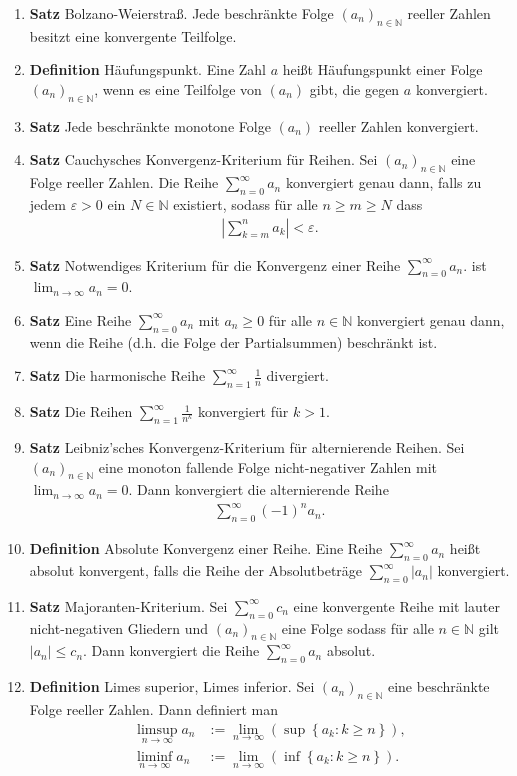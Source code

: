 \documentclass[draft,a5paper]{article}
\newcommand{\mg}[1]{\mathbb{#1}}
\newcommand{\defn}[1]{\item \textbf{Definition} #1.}
\newcommand{\satz}[1]{\item \textbf{Satz} #1.}
\begin{document}
\begin{enumerate}
\satz{Bolzano-Weierstraß}  Jede beschränkte Folge
\((a_n)_{n\in \mg{N}}\) reeller Zahlen besitzt eine
konvergente Teilfolge.

\defn{Häufungspunkt} Eine Zahl \(a\) heißt Häufungspunkt
einer Folge \((a_n)_{n \in \mg{N}}\), wenn es eine
Teilfolge von \((a_n)\) gibt, die gegen \(a\) konvergiert.

\satz{Jede beschränkte monotone Folge \((a_n)\) reeller
  Zahlen konvergiert}

\satz{Cauchysches Konvergenz-Kriterium für Reihen}  Sei
\((a_n)_{n \in \mg{N}}\) eine Folge reeller Zahlen.  Die
Reihe \(\sum_{n=0}^{\infty}{a_n}\) konvergiert genau dann,
falls zu jedem \(\varepsilon > 0\) ein \(N \in \mg{N}\)
existiert, sodass für alle \(n \ge m \ge N\) dass
\begin{align*}
\left| \sum_{k=m}^n{a_k} \right| < \varepsilon.
\end{align*}

\satz{Notwendiges Kriterium für die Konvergenz einer
  Reihe \(\sum_{n=0}^{\infty}{a_n}\)} ist $\lim_{n\to
  \infty}{a_n} = 0$.

\satz{Eine Reihe \(\sum_{n = 0}^{\infty}{a_n}\) mit
  \(a_n \ge 0\) für alle \(n \in \mg{N}\) konvergiert genau
  dann, wenn die Reihe (d.h. die Folge der
  Partialsummen) beschränkt ist}

\satz{Die harmonische Reihe
  \(\sum_{n=1}^{\infty}{\frac{1}{n}}\) divergiert}

\satz{Die Reihen \(\sum_{n=1}^{\infty}{\frac{1}{n^k}}\)
  konvergiert für \(k > 1\)}

\satz{Leibniz'sches Konvergenz-Kriterium für
  alternierende Reihen}  Sei $(a_n)_{n
\in \mg{N}}$ eine monoton fallende Folge nicht-negativer
Zahlen mit \(\lim_{n \to \infty}{a_n} = 0\).  Dann
konvergiert die alternierende Reihe
\begin{align*}
\sum_{n=0}^{\infty}{(-1)^n {a_n}}.
\end{align*}

\defn{Absolute Konvergenz einer Reihe}  Eine Reihe
\(\sum_{n=0}^{\infty}{a_n}\) heißt absolut konvergent,
falls die Reihe der Absolutbeträge
\(\sum_{n=0}^{\infty}{\left| a_n \right|}\) konvergiert.

\satz{Majoranten-Kriterium} Sei
\(\sum_{n=0}^{\infty}{c_n}\) eine konvergente Reihe mit
lauter nicht-negativen Gliedern und $(a_n)_{n\in
  \mg{N}}$ eine Folge sodass für alle \(n \in \mg{N}\)
gilt
\(\left| a_n \right| \le c_n\).
Dann konvergiert die Reihe \(\sum_{n=0}^{\infty}{a_n}\)
absolut.

\defn{Limes superior, Limes inferior} Sei
\((a_n)_{n \in \mg{N}}\) eine beschränkte Folge reeller
Zahlen.  Dann definiert man
\begin{align*}
  \limsup_{n \to \infty}{a_n}
  &:= \lim_{n \to \infty}
    \left( \sup \left\{ a_k \colon k \ge n \right\}
    \right), \\
  \liminf_{n \to \infty}{a_n}
  &:= \lim_{n \to \infty}
    \left( \inf \left\{ a_k \colon k \ge n \right\} \right).
\end{align*}



\end{enumerate}
\end{document}
